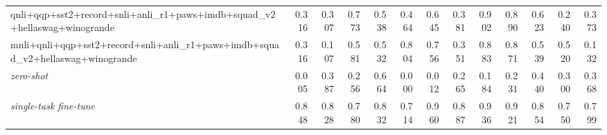 \begin{table}[t]
\begin{tabular}{lrrrrrrrrrrrr}
    qnli+qqp+sst2+record+snli+anli\_r1+paws+imdb+squad\_v2+hellaswag+winogrande & 0.316 & 0.307 & 0.773 & 0.538 & 0.464 & 0.645 & 0.381 & 0.902 & 0.890 & 0.623 & 0.240 & 0.373 \\
    \addlinespace
    mnli+qnli+qqp+sst2+record+snli+anli\_r1+paws+imdb+squad\_v2+hellaswag+winogrande & 0.316 & 0.107 & 0.581 & 0.532 & 0.804 & 0.756 & 0.351 & 0.883 & 0.871 & 0.539 & 0.520 & 0.132 \\
    \midrule
    \textit{zero-shot} & 0.005 & 0.387 & 0.256 & 0.664 & 0.000 & 0.012 & 0.265 & 0.184 & 0.231 & 0.440 & 0.300 & 0.368 \\
    \textit{single-task fine-tune} & 0.848 & 0.828 & 0.780 & 0.832 & 0.714 & 0.960 & 0.887 & 0.936 & 0.921 & 0.854 & 0.750 & 0.799 \\
    \bottomrule
  \end{tabular}
\end{table}
